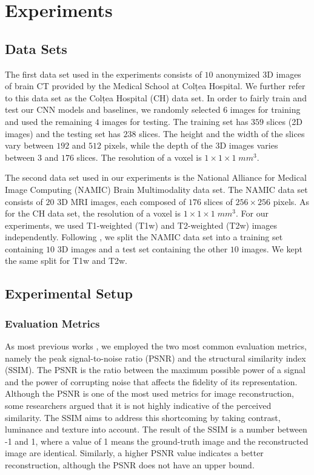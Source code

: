 \documentclass{ieeeaccess}
\begin{document}
\section{Experiments}
\label{sec_Experiments}

\subsection{Data Sets}

The first data set used in the experiments consists of $10$ anonymized 3D images of brain CT provided by the Medical School at Colțea Hospital. We further refer to this data set as the Colțea Hospital (CH) data set. In order to fairly train and test our CNN models and baselines, we randomly selected $6$ images for training and used the remaining $4$ images for testing. The training set has $359$ slices (2D images) and the testing set has $238$ slices. The height and the width of the slices vary between $192$ and $512$ pixels, while the depth of the 3D images varies between $3$ and $176$ slices. The resolution of a voxel is $1 \times 1 \times 1\; mm^3$.

The second data set used in our experiments is the National Alliance for Medical Image Computing (NAMIC) Brain Multimodality data set. The NAMIC data set consists of $20$ 3D MRI images, each composed of $176$ slices of $256 \times 256$ pixels. As for the CH data set, the resolution of a voxel is $1 \times 1 \times 1\;mm^3$. For our experiments, we used T1-weighted (T1w) and T2-weighted (T2w) images independently. Following \cite{Pham-CMIG-2019}, we split the NAMIC data set into a training set containing $10$ 3D images and a test set containing the other $10$ images. We kept the same split for T1w and T2w.

\subsection{Experimental Setup}

\subsubsection{Evaluation Metrics}

As most previous works \cite{ Du-AS-2019,  Du-NC-2019,  Li-Access-2019, Oktay-MICCAI-2016, Pham-CMIG-2019, Shi-JBHI-2018, You-TMI-2019, Yu-ICIP-2017, ZENG-CBM-2018, Zhao-TMI-2019}, we employed the two most common evaluation metrics, namely the peak signal-to-noise ratio (PSNR) and the structural similarity index (SSIM). The PSNR is the ratio between the maximum possible power of a signal and the power of corrupting noise that affects the fidelity of its representation. Although the PSNR is one of the most used metrics for image reconstruction, some researchers \cite{Wang-TIP-2004,Wang-SPM-2009} argued that it is not highly indicative of the perceived similarity. The SSIM \cite{Wang-TIP-2004} aims to address this shortcoming by taking contrast, luminance and texture into account. The result of the SSIM is a number between -1 and 1, where a value of 1 means the ground-truth image and the reconstructed image are identical. Similarly, a higher PSNR value indicates a better reconstruction, although the PSNR does not have an upper bound.
\end{document}
